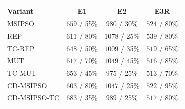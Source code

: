 \begin{tabular}{lccc}
\hline
Variant & E1 & E2 & E3R \\
\hline
MSIPSO & $659$ / 55\% & $980$ / 30\% & $524$ / 80\% \\
REP & $611$ / 80\% & $1078$ / 25\% & $539$ / 80\% \\
TC-REP & $648$ / 50\% & $1009$ / 35\% & $519$ / 65\% \\
MUT & $617$ / 70\% & $1049$ / 45\% & $516$ / 85\% \\
TC-MUT & $653$ / 45\% & $975$ / 25\% & $513$ / 70\% \\
CD-MSIPSO & $603$ / 80\% & $1047$ / 25\% & $522$ / 95\% \\
CD-MSIPSO-TC & $683$ / 35\% & $989$ / 25\% & $517$ / 80\% \\
\hline
\end{tabular}